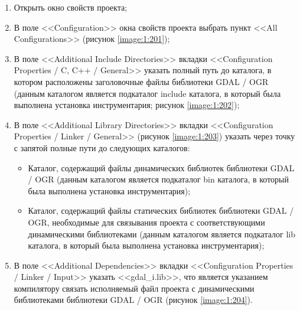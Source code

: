 \begin{enumerate}

	\item Открыть окно свойств проекта;
	\item В поле <<Configuration>> окна свойств проекта выбрать пункт <<All Configurations>> (рисунок \ref{image:1:201});
	\item В поле <<Additional Include Directories>> вкладки <<Configuration Properties / C, C++ / General>> указать полный путь до каталога, в котором расположены заголовочные файлы библиотеки GDAL / OGR (данным каталогом является подкаталог include каталога, в который была выполнена установка инструментария; рисунок \ref{image:1:202});
	\item В поле <<Additional Library Directories>> вкладки <<Configuration Properties / Linker / General>> (рисунок \ref{image:1:203}) указать через точку с запятой полные пути до следующих каталогов:

	\begin{itemize}

		\item Каталог, содержащий файлы динамических библиотек библиотеки GDAL / OGR (данным каталогом является подкаталог bin каталога, в который была выполнена установка инструментария);
		\item Каталог, содержащий файлы статических библиотек библиотеки GDAL / OGR, необходимые для связывания проекта с соответствующими динамическими библиотеками (данным каталогом является подкаталог lib каталога, в который была выполнена установка инструментария);

	\end{itemize}

	\item В поле <<Additional Dependencies>> вкладки <<Configuration Properties / Linker / Input>> указать <<gdal\_i.lib>>, что является указанием компилятору связать исполняемый файл проекта с динамическими библиотеками библиотеки GDAL / OGR (рисунок \ref{image:1:204}).

\end{enumerate}

\begin{landscape}
\end{landscape}

